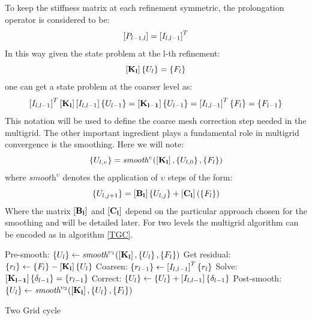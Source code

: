  To keep the stiffness matrix at each refinement symmetric, the prolongation operator is considered to be:
 \begin{equation}
 \left[{P_{l-1,l}}\right]=\left[{I_{l,l-1}}\right]^T
 \end{equation}
 In this way given the state problem at the l-th refinement:
 \begin{equation}
 \left[{\mathbf{K_{l}}}\right]\left\lbrace{U_{l}}\right \rbrace=\left\lbrace{F_{l}}\right \rbrace
 \end{equation}
 one can get a state problem at the coarser level as:
  \begin{equation}
  \left[{I_{l,l-1}}\right]^T \left[{\mathbf{K_{l}}}\right]\left[{I_{l,l-1}}\right]\left\lbrace{U_{l-1}}\right \rbrace=\left[{\mathbf{K_{l-1}}}\right]\left\lbrace{U_{l-1}}\right \rbrace=\left[{I_{l,l-1}}\right]^T\left\lbrace{F_{l}}\right \rbrace=\left\lbrace{F_{l-1}}\right \rbrace
  \end{equation}
  This notation will be used to define the coarse mesh correction step needed in the multigrid. The other important ingredient plays a fundamental role in multigrid convergence is the smoothing.
  Here we will note:
  \begin{equation}
 \left\lbrace{U_{l,\upsilon}}\right \rbrace=\textit{smooth}^{\upsilon}(\left[{\mathbf{K_{l}}}\right],\left\lbrace{U_{l,0}}\right \rbrace,\left\lbrace{F_{l}}\right \rbrace)
  \end{equation}
  where $\textit{smooth}^{\upsilon}$ denotes the application of $\upsilon$ steps of the form:
  \begin{equation}
 \left\lbrace{ U_{l,j+1}}\right \rbrace= \left[{\mathbf{B_{l}}}\right]\left\lbrace{U_{l,j}}\right \rbrace+\left[{\mathbf{C_{l}}}\right]\left(\left\lbrace{F_{l}}\right \rbrace\right)
  \end{equation}
  Where the matrix $\left[{\mathbf{B_{l}}}\right]$ and $\left[{\mathbf{C_{l}}}\right]$ depend on the particular approach chosen for the smoothing and will be detailed later. For two levels the multigrid algorithm can be encoded as in algorithm \ref{TGC}.
  \begin{algorithm}
 Pre-smooth: $\left\lbrace{U_{l}}\right \rbrace\gets\textit{smooth}^{\upsilon_1}(\left[{\mathbf{K_{l}}}\right],\left\lbrace{U_{l}}\right \rbrace,\left\lbrace{F_{l}}\right \rbrace)$\;
 Get residual: $\left\lbrace{r_{l}}\right \rbrace\gets\left\lbrace{F_{l}}\right \rbrace-\left[{\mathbf{K_{l}}}\right]\left\lbrace{U_{l}}\right \rbrace$\;
 Coarsen: $\left\lbrace{r_{l-1}}\right \rbrace\gets\left[{I_{l,l-1}}\right]^T\left\lbrace{r_{l}}\right \rbrace$\;
 Solve: $\left[{\mathbf{K_{l-1}}}\right]\left\lbrace{\delta_{l-1}}\right \rbrace=\left\lbrace{r_{l-1}}\right \rbrace$\;
 Correct: $\left\lbrace{U_{l}}\right \rbrace\gets\left\lbrace{U_{l}}\right \rbrace+\left[{I_{l,l-1}}\right]\left\lbrace{\delta_{l-1}}\right \rbrace$\;
 Post-smooth: $\left\lbrace{U_{l}}\right \rbrace\gets\textit{smooth}^{\upsilon_2}(\left[{\mathbf{K_{l}}}\right],\left\lbrace{U_{l}}\right \rbrace,\left\lbrace{F_{l}}\right \rbrace)$\;
   \caption{Two Grid cycle \label{TGC}}
  \end{algorithm}
